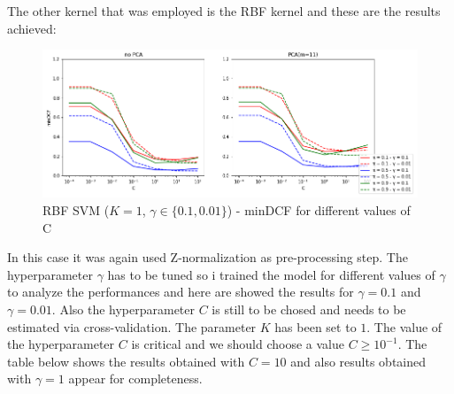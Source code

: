 \documentclass[10pt, a4paper, twocolumn]{article} %
\begin{document}
The other kernel that was employed is the RBF kernel and these are the results achieved:
\begin{figure}[ht!]
	\includegraphics[width=\linewidth]{./Pictures/FeaturesAnalysis/rbfsvm_znorm_compl.png}
	\caption{RBF SVM ($K=1$, $\gamma \in \{0.1, 0.01\}$) - minDCF for different values of C}
	\label{rbfsvm_znorm} 
\end{figure}
In this case it was again used Z-normalization as pre-processing step. The hyperparameter $\gamma$ has to be tuned
so i trained the model for different values of $\gamma$ to analyze the performances and here are showed
the results for $\gamma = 0.1$ and $\gamma = 0.01$. Also the hyperparameter $C$ is still to be
chosed and needs to be estimated via cross-validation. The parameter $K$ has been set to $1$.
The value of the hyperparameter $C$ is critical and we should choose a value
$C \ge 10^{-1}$. The table below shows the results obtained with $C=10$ and also results
obtained with $\gamma = 1$ appear for completeness.
\FloatBarrier
\end{document}
